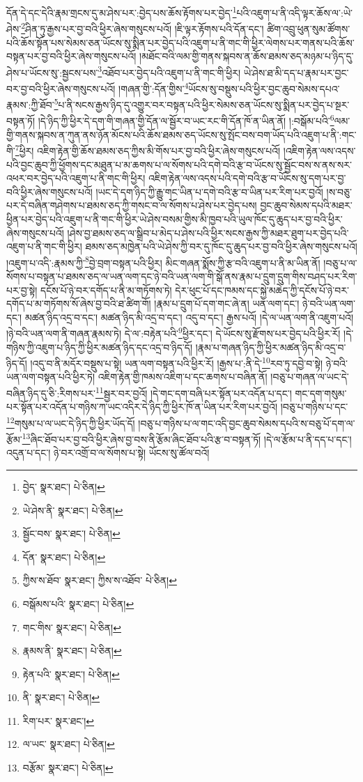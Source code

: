 དོན་དེ་དང་དེའི་རྣམ་གྲངས་དུ་མ་ཤེས་པར་:བྱེད་པས་ཆོས་རྟོགས་པར་བྱེད་\footnote{བྱེད་  སྣར་ཐང་།  པེ་ཅིན། }པའི་འཇུག་པ་ནི་འདི་ལྟར་ཆོས་ལ་:ཡེ་ཤེས་\footnote{ཡེ་ཤེས་ནི་  སྣར་ཐང་།  པེ་ཅིན། }ཤིན་ཏུ་རྒྱས་པར་བྱ་བའི་ཕྱིར་ཞེས་གསུངས་པའོ། །ཇི་ལྟར་རྟོགས་པའི་དོན་དང་། ཚིག་འབྲུ་ཕུན་སུམ་ཚོགས་པའི་ཆོས་སྟོན་པས་སེམས་ཅན་ཡོངས་སུ་སྨིན་པར་བྱེད་པའི་འཇུག་པ་ནི་གང་གི་ཕྱིར་ལེགས་པར་གནས་པའི་ཆོས་བསྟན་པར་བྱ་བའི་ཕྱིར་ཞེས་གསུངས་པའོ། །མཐོང་བའི་ལམ་གྱི་གནས་སྐབས་ན་ཆོས་ཐམས་ཅད་མཉམ་པ་ཉིད་དུ་ཤེས་པ་ཡོངས་སུ་:སྦྱངས་པས་\footnote{སྦྱོང་བས་  སྣར་ཐང་།  པེ་ཅིན། }འཐོབ་པར་བྱེད་པའི་འཇུག་པ་ནི་གང་གི་ཕྱིར། ཡེ་ཤེས་ཐ་མི་དད་པ་རྣམ་པར་བྱང་བར་བྱ་བའི་ཕྱིར་ཞེས་གསུངས་པའོ། །གཞན་གྱི་:དོན་གྱིས་\footnote{དོན་  སྣར་ཐང་།  པེ་ཅིན། }ཡོངས་སུ་བསྡུས་པའི་ཕྱིར་བྱང་ཆུབ་སེམས་དཔའ་རྣམས་:ཀྱི་ཐོབ་\footnote{ཀྱིས་ས་ཐོབ་  སྣར་ཐང་། ཀྱིས་ས་འཐོབ་  པེ་ཅིན། }པ་ནི་སངས་རྒྱས་ཉིད་དུ་འགྱུར་བར་བསྟན་པའི་ཕྱིར་སེམས་ཅན་ཡོངས་སུ་སྨིན་པར་བྱེད་པ་སྔར་བསྟན་ཏོ། །དེ་ཉིད་ཀྱི་ཕྱིར་དེ་དག་གི་གཞན་གྱི་དོན་ལ་སྦྱོར་བ་ཡང་རང་གི་དོན་ཁོ་ན་ཡིན་ནོ། །:བསྒོམ་པའི་\footnote{བསྒོམས་པའི་  སྣར་ཐང་།  པེ་ཅིན། }ལམ་གྱི་གནས་སྐབས་ན་ཀུན་ནས་ཉོན་མོངས་པའི་ཆོས་ཐམས་ཅད་ཡོངས་སུ་སྤོང་བས་བག་ཡོད་པའི་འཇུག་པ་ནི་:གང་གི་\footnote{གང་གིས་  སྣར་ཐང་།  པེ་ཅིན། }ཕྱིར། འཇིག་རྟེན་གྱི་ཆོས་ཐམས་ཅད་ཀྱིས་མི་གོས་པར་བྱ་བའི་ཕྱིར་ཞེས་གསུངས་པའོ། །འཇིག་རྟེན་ལས་འདས་པའི་བྱང་ཆུབ་ཀྱི་ཕྱོགས་དང་མཐུན་པ་མ་ཆགས་པ་ལ་སོགས་པའི་དགེ་བའི་རྩ་བ་ཡོངས་སུ་སྦྱོང་བས་ས་ནས་སར་འཕར་བར་བྱེད་པའི་འཇུག་པ་ནི་གང་གི་ཕྱིར། འཇིག་རྟེན་ལས་འདས་པའི་དགེ་བའི་རྩ་བ་ཡོངས་སུ་དག་པར་བྱ་བའི་ཕྱིར་ཞེས་གསུངས་པའོ། །ཡང་དེ་དག་ཉིད་ཀྱི་རྒྱུ་གང་ཡིན་པ་དགེ་བའི་རྩ་བ་ཡིན་པར་རིག་པར་བྱའོ། །ས་བཅུ་པར་དེ་བཞིན་གཤེགས་པ་ཐམས་ཅད་ཀྱི་གསང་བ་ལ་སོགས་པ་ཤེས་པར་བྱེད་པས། བྱང་ཆུབ་སེམས་དཔའི་མཐར་ཕྱིན་པར་བྱེད་པའི་འཇུག་པ་ནི་གང་གི་ཕྱིར་ཡེ་ཤེས་བསམ་གྱིས་མི་ཁྱབ་པའི་ཡུལ་ཁོང་དུ་ཆུད་པར་བྱ་བའི་ཕྱིར་ཞེས་གསུངས་པའོ། །ཤེས་བྱ་ཐམས་ཅད་ལ་སྒྲིབ་པ་མེད་པ་ཤེས་པའི་ཕྱིར་སངས་རྒྱས་ཀྱི་མཐར་ཐུག་པར་བྱེད་པའི་འཇུག་པ་ནི་གང་གི་ཕྱིར། ཐམས་ཅད་མཁྱེན་པའི་ཡེ་ཤེས་ཀྱི་བར་དུ་ཁོང་དུ་ཆུད་པར་བྱ་བའི་ཕྱིར་ཞེས་གསུངས་པའོ། །འཇུག་པ་འདི་:རྣམས་ཀྱི་\footnote{རྣམས་ནི་  སྣར་ཐང་།  པེ་ཅིན། }བྱེ་བྲག་བསྟན་པའི་ཕྱིར། མིང་གཞན་སྨོས་ཀྱི་རྩ་བའི་འཇུག་པ་ནི་མ་ཡིན་ནོ། །བཅུ་པ་ལ་སོགས་པ་བསྟན་པ་ཐམས་ཅད་ལ་ཡན་ལག་དང་ཉེ་བའི་ཡན་ལག་གི་སྒོ་ནས་རྣམ་པ་དྲུག་དྲུག་གིས་བཤད་པར་རིག་པར་བྱ་སྟེ། དངོས་པོ་ཉེ་བར་དགོད་པ་ནི་མ་གཏོགས་ཏེ། དེར་ཕུང་པོ་དང་ཁམས་དང་སྐྱེ་མཆེད་ཀྱི་དངོས་པོ་ཉེ་བར་དགོད་པ་མ་གཏོགས་སོ་ཞེས་བྱ་བའི་ཐ་ཚིག་གོ། །རྣམ་པ་དྲུག་པོ་དག་གང་ཞེ་ན། ཡན་ལག་དང་། ཉེ་བའི་ཡན་ལག་དང་། མཚན་ཉིད་འདྲ་བ་དང་། མཚན་ཉིད་མི་འདྲ་བ་དང་། འདུ་བ་དང་། རྒྱས་པའོ། །དེ་ལ་ཡན་ལག་ནི་འཇུག་པའོ། །ཉེ་བའི་ཡན་ལག་ནི་གཞན་རྣམས་ཏེ། དེ་ལ་:བརྟེན་པའི་\footnote{རྟེན་པའི་  སྣར་ཐང་།  པེ་ཅིན། }ཕྱིར་དང་། དེ་ཡོངས་སུ་རྫོགས་པར་བྱེད་པའི་ཕྱིར་རོ། །དེ་གཉིས་ཀྱི་འཇུག་པ་ཉིད་ཀྱི་ཕྱིར་མཚན་ཉིད་དང་འདྲ་བ་ཉིད་དོ། །རྣམ་པ་གཞན་ཉིད་ཀྱི་ཕྱིར་མཚན་ཉིད་མི་འདྲ་བ་ཉིད་དོ། །འདུ་བ་ནི་མདོར་བསྡུས་པ་སྟེ། ཡན་ལག་བསྟན་པའི་ཕྱིར་རོ། །རྒྱས་པ་:ནི་དེ་\footnote{ནི་  སྣར་ཐང་།  པེ་ཅིན། }རབ་ཏུ་དབྱེ་བ་སྟེ། ཉེ་བའི་ཡན་ལག་བསྟན་པའི་ཕྱིར་ཏེ། འཇིག་རྟེན་གྱི་ཁམས་འཇིག་པ་དང་ཆགས་པ་བཞིན་ནོ། །བཅུ་པ་གཞན་ལ་ཡང་དེ་བཞིན་ཉིད་དུ་ཅི་:རིགས་པར་\footnote{རིག་པར་  སྣར་ཐང་། }སྦྱར་བར་བྱའོ། །དེ་གང་དག་བཞི་པར་སྟོན་པར་འདོན་པ་དང་། གང་དག་གསུམ་པར་སྟོན་པར་འདོན་པ་གཉིས་ཀ་ཡང་འདིར་དེ་ཉིད་ཀྱི་ཕྱིར་ཁོ་ན་ཡིན་པར་རིག་པར་བྱའོ། །བཅུ་པ་གཉིས་པ་དང་\footnote{ལ་ཡང་  སྣར་ཐང་།  པེ་ཅིན། }གསུམ་པ་ལ་ཡང་དེ་ཉིད་ཀྱི་ཕྱིར་ཡོད་དོ། །བཅུ་པ་གཉིས་པ་ལ་གང་འདི་བྱང་ཆུབ་སེམས་དཔའི་ས་བཅུ་པོ་དག་ལ་རྩོམ་\footnote{བརྩོམ་  སྣར་ཐང་།  པེ་ཅིན། }ཞིང་ཐོབ་པར་བྱ་བའི་ཕྱིར་ཞེས་བྱ་བས་ནི་རྩོམ་ཞིང་ཐོབ་པའི་རྩ་བ་བསྟན་ཏོ། །དེ་ལ་རྩོམ་པ་ནི་དད་པ་དང་། འདུན་པ་དང་། ཉེ་བར་འགྲོ་བ་ལ་སོགས་པ་སྟེ། ཡོངས་སུ་ཚོལ་བའོ། 